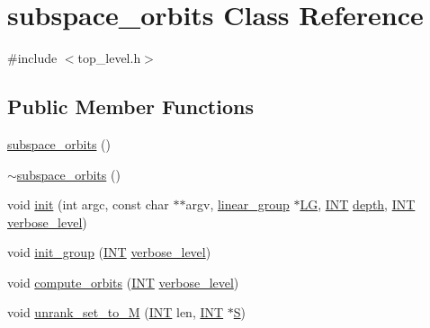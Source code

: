 \hypertarget{classsubspace__orbits}{}\section{subspace\+\_\+orbits Class Reference}
\label{classsubspace__orbits}


{\ttfamily \#include $<$top\+\_\+level.\+h$>$}

\subsection*{Public Member Functions}
\begin{DoxyCompactItemize}
\item 
\mbox{\hyperlink{classsubspace__orbits_a80622ec286b1fbdc91dd97da0eb8c318}{subspace\+\_\+orbits}} ()
\item 
\mbox{\hyperlink{classsubspace__orbits_af72dac3eb8591f49c8d82e0ea3e75743}{$\sim$subspace\+\_\+orbits}} ()
\item 
void \mbox{\hyperlink{classsubspace__orbits_ac4bc50572798a6f0bc86fb99b181b66d}{init}} (int argc, const char $\ast$$\ast$argv, \mbox{\hyperlink{classlinear__group}{linear\+\_\+group}} $\ast$\mbox{\hyperlink{classsubspace__orbits_a4bb40dcf4638d7d27da887b19685beea}{LG}}, \mbox{\hyperlink{galois_8h_a09fddde158a3a20bd2dcadb609de11dc}{I\+NT}} \mbox{\hyperlink{classsubspace__orbits_a956f599626b814169a93e8a8d9d05951}{depth}}, \mbox{\hyperlink{galois_8h_a09fddde158a3a20bd2dcadb609de11dc}{I\+NT}} \mbox{\hyperlink{simeon_8_c_a818073fbcc2f439e7c56952f67386122}{verbose\+\_\+level}})
\item 
void \mbox{\hyperlink{classsubspace__orbits_ad7dfe4f51cd3eea6ccfd5318e23d36c3}{init\+\_\+group}} (\mbox{\hyperlink{galois_8h_a09fddde158a3a20bd2dcadb609de11dc}{I\+NT}} \mbox{\hyperlink{simeon_8_c_a818073fbcc2f439e7c56952f67386122}{verbose\+\_\+level}})
\item 
void \mbox{\hyperlink{classsubspace__orbits_a2778f8d49cde1675de1ef6acfe180b63}{compute\+\_\+orbits}} (\mbox{\hyperlink{galois_8h_a09fddde158a3a20bd2dcadb609de11dc}{I\+NT}} \mbox{\hyperlink{simeon_8_c_a818073fbcc2f439e7c56952f67386122}{verbose\+\_\+level}})
\item 
void \mbox{\hyperlink{classsubspace__orbits_a9440573e13ae98d29694664bf23bad83}{unrank\+\_\+set\+\_\+to\+\_\+M}} (\mbox{\hyperlink{galois_8h_a09fddde158a3a20bd2dcadb609de11dc}{I\+NT}} len, \mbox{\hyperlink{galois_8h_a09fddde158a3a20bd2dcadb609de11dc}{I\+NT}} $\ast$\mbox{\hyperlink{simeon_8_c_adab47f8243f1b5a2c31df2535d6b37d0}{S}})
$$
\end{DoxyCompactItemize}
